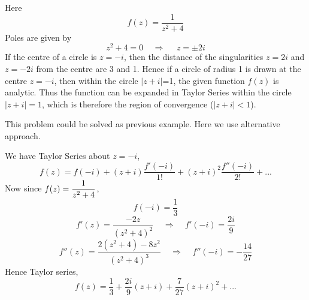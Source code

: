 \begin{solution}
Here \[f(z) = \frac{1}{z^2+4}\]
Poles are given by
\[z^2+4 = 0 ~~~~~\Rightarrow ~~~~~~z=\pm 2i\]
If the centre of a circle is $z=-i$, then the distance of the singularities $z=2i$ and $z=-2i$ from the centre are 3 and 1. Hence if a circle of radius 1 is drawn at the centre $z=-i$, then within the circle $|z+i|$=1, the given function $f(z)$ is analytic. Thus the function can be expanded in Taylor Series within the circle $|z+i|=1$, which is therefore the region of convergence ($|z+i|<1$).

\noindent
This problem could be solved as previous example. Here we use alternative approach.

\noindent
We have Taylor Series about $z=-i$,
\[f(z) = f(-i) + (z+i)\frac{f'(-i)}{1!}+ (z+i)^2\frac{f''(-i)}{2!} + ...\]
Now since $\displaystyle f(z)=\frac{1}{z^2+4}$,
\[f(-i) = \frac{1}{3}\]
\[f'(z) = \frac{-2z}{(z^2+4)^2}~~~~~ \Rightarrow ~~~~~ f'(-i) = \frac{2i}{9}\]
\[f''(z) = \frac{2(z^2+4)-8z^2}{(z^2+4)^3}~~~~~ \Rightarrow ~~~~~ f''(-i) = -\frac{14}{27}\]
Hence Taylor series,
\[f(z) =  \frac{1}{3} +  \frac{2i}{9}(z+i)+ \frac{7}{27}(z+i)^2 + ...\]
\end{solution}

